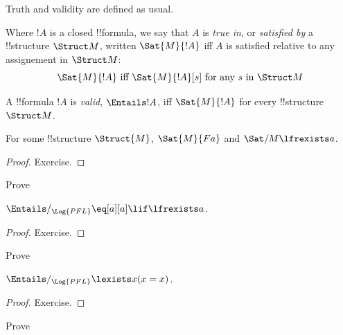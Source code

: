 \documentclass[../../../include/open-logic-section]{subfiles}
\begin{document}
Truth and validity are defined as usual.

\begin{defn}[Truth]
Where $!A$ is a closed !!{formula}, we say that $A$ is \emph{true in}, or
\emph{satisfied by} a !!{structure} $\Struct M$, written $\Sat{M}{!A}$ iff 
$A$ is satisfied relative to any assignement in $\Struct M$:
$$\Sat{M}{!A}\textrm{ iff }\Sat{M}{!A}[s]\textrm{ for any }s\textrm{ in }\Struct M$$
\end{defn}

\begin{defn}[Validity]
A !!{formula} $!A$ is \emph{valid}, $\Entails !A$, iff $\Sat{M}{!A}$ for every
!!{structure}~$\Struct M$.
\end{defn}

\begin{prop}
  For some  !!{structure} $\Struct{M}$, $\Sat{M}{Fa}$ and $\Sat/{M}{\lfrexists a}$.
\end{prop}

\begin{proof}
  Exercise.
\end{proof}

\begin{prob}
  Prove 
\end{prob}

\begin{prop}
$\Entails/_{\Log{PFL}} \eq[a][a]\lif\lfrexists a$.
\end{prop}

\begin{proof}
Exercise.
\end{proof}

\begin{prob}
  Prove 
\end{prob}

\begin{prop}
$\Entails/_{\Log{PFL}} \lexists x (x = x)$.
\end{prop}

\begin{proof}
Exercise.
\end{proof}

\begin{prob}
  Prove 
\end{prob}
\end{document}
